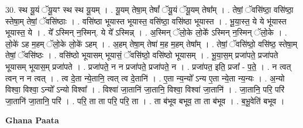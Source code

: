 \documentclass[17pt]{extarticle}
\begin{document}
30. स्थ यू॒यं ॅयू॒यꣳ स्थ स्थ यू॒यम् । . यू॒यम् तेषा॒म् तेषां᳚ ॅयू॒यं ॅयू॒यम् तेषा᳚म् । . तेषां॒ ॅवसि॑ष्ठा॒ वसि॑ष्ठा॒ स्तेषा॒म् तेषां॒ ॅवसि॑ष्ठाः । . वसि॑ष्ठा भूयास्त भूयास्त॒ वसि॑ष्ठा॒ वसि॑ष्ठा भूयास्त । . भू॒या॒स्त॒ ये ये भू॑यास्त भूयास्त॒ ये । . ये᳚ ऽस्मिन् न॒स्मिन्. ये ये᳚ ऽस्मिन्न् । . अ॒स्मिन् ॅलो॒के लो॒के᳚ ऽस्मिन् न॒स्मिन् ॅलो॒के । . लो॒के॑ ऽह म॒हम् ॅलो॒के लो॒के॑ ऽहम् । . अ॒हम् तेषा॒म् तेषा॑ म॒ह म॒हम् तेषा᳚म् । . तेषां॒ ॅवसि॑ष्ठो॒ वसि॑ष्ठ॒ स्तेषा॒म् तेषां॒ ॅवसि॑ष्ठः । . वसि॑ष्ठो भूयासम् भूयासं॒ ॅवसि॑ष्ठो॒ वसि॑ष्ठो भूयासम् । . भू॒या॒स॒म् प्रजा॑पते॒ प्रजा॑पते भूयासम् भूयास॒म् प्रजा॑पते । . प्रजा॑पते॒ न न प्रजा॑पते॒ प्रजा॑पते॒ न । . प्रजा॑पत॒ इति॒ प्रजा᳚ - प॒ते॒ । . न त्वत् त्वन् न न त्वत् । . त्व दे॒ता न्ये॒तानि॒ त्वत् त्व दे॒तानि॑ । . ए॒ता न्य॒न्यो᳚ ऽन्य ए॒ता न्ये॒ता न्य॒न्यः । . अ॒न्यो विश्वा॒ विश्वा॒ ऽन्यो᳚ ऽन्यो विश्वा᳚ । . विश्वा॑ जा॒तानि॑ जा॒तानि॒ विश्वा॒ विश्वा॑ जा॒तानि॑ । . जा॒तानि॒ परि॒ परि॑ जा॒तानि॑ जा॒तानि॒ परि॑ । . परि॒ ता ता परि॒ परि॒ ता । . ता ब॑भूव बभूव॒ ता ता ब॑भूव । . ब॒भू॒वेति॑ बभूव । \newline

\textbf{Ghana Paata } \newline
\end{document}
